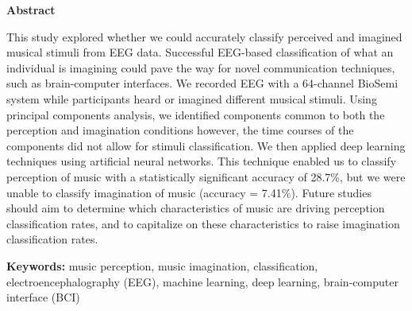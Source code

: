 \begin{preliminary}
\maketitle
{}
\makecert
\newpage
{}
\Large\begin{center}\textbf{Abstract}\end{center}\normalsize
\begin{spacing}{2}
This study explored whether we could accurately classify perceived and imagined musical stimuli from EEG data. 
Successful EEG-based classification of what an individual is imagining could pave the way for novel communication techniques, such as brain-computer interfaces. 
We recorded EEG with a 64-channel BioSemi system while participants heard or imagined different musical stimuli. 
Using principal components analysis, we identified components common to both the perception and imagination conditions however, the time courses of the components did not allow for stimuli classification. 
We then applied deep learning techniques using artificial neural networks. 
This technique enabled us to classify perception of music with a statistically significant accuracy of 28.7\%, but we were unable to classify imagination of music (accuracy = 7.41\%). 
Future studies should aim to determine which characteristics of music are driving perception classification rates, and to capitalize on these characteristics to raise imagination classification rates. 
\end{spacing}
\vfill
\textbf{Keywords:} music perception, music imagination, classification, electroencephalography (EEG), machine learning, deep learning, brain-computer interface (BCI)
\newpage
{}
\acknowledge{\makeacknowledge}	%
\newpage
\tableofcontents
\newpage
{}
\listoftables
\newpage
{}
\listoffigures
\newpage
{}
\listofmyappendices\newpage
\cleardoublepage
\end{preliminary}